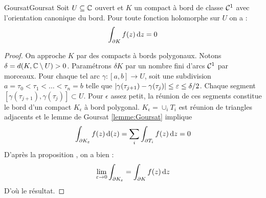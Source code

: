 \documentclass{cours}
\begin{document}
\begin{théorème}{Goursat}{Goursat}
	Soit $U \subseteq \mathbb{C}$ ouvert et $K$ un compact à bord de classe $\mathcal{C}^{1}$ avec l'orientation canonique du bord. Pour toute fonction holomorphe sur $U$ on a : 
	\[
		\int_{\partial K}f(z){\rm \, d} z = 0
	\]
\end{théorème}
\begin{proof}
    On approche $K$ par des compacts à bords polygonaux. Notons $\delta = d(K, \mathbb{C}\setminus U) > 0$. 
    Paramétrons $\delta K$ par un nombre fini d'arcs $\mathcal{C}^{1}$ par morceaux. Pour chaque tel arc $\gamma : [a, b] \to U$, soit une subdivision $a = \tau_{0} < \tau_{1} < \ldots < \tau_{n} = b$ telle que $\left|\gamma(\tau_{j + 1}) - \gamma(\tau_{j})\right| \leq \varepsilon \leq \delta/2$. 
    Chaque segment $[\gamma(\tau_{j + 1}), \gamma(\tau_{j})] \subset U$. 
    Pour $\epsilon$ assez petit, la réunion de ces segments constitue le bord d'un compact $K_{\epsilon}$ à bord polygonal. 
    $K_{\epsilon} = \cup_{i} T_{i}$ est réunion de triangles adjacents et le lemme de Goursat \ref{lemme:Goursat} implique 
    \[
        \int_{\partial K_{\varepsilon}}f(z){\rm \, d}(z) = \sum_{i}\int_{\partial T_{i}} f(z) {\rm \, d} z = 0
    \]
    D'après la proposition , on a bien : 
    \[
        \lim_{\varepsilon \to 0}\int_{\partial K_{\varepsilon}} = \int_{\partial K}f(z){\rm \, d} z
    \]
    D'où le résultat. 
\end{proof}
\end{document}
